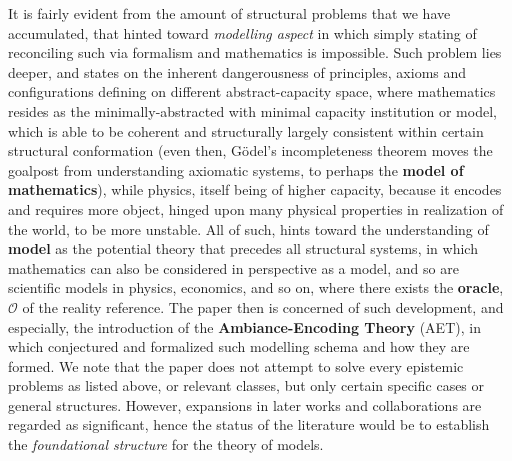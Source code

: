 It is fairly evident from the amount of structural problems that we have accumulated, that hinted toward \textit{modelling aspect} in which simply stating of reconciling such via formalism and mathematics is impossible. Such problem lies deeper, and states on the inherent dangerousness of principles, axioms and configurations defining on different abstract-capacity space, where mathematics resides as the minimally-abstracted with minimal capacity institution or model, which is able to be coherent and structurally largely consistent within certain structural conformation (even then, Gödel's incompleteness theorem moves the goalpost from understanding axiomatic systems, to perhaps the \textbf{model of mathematics}), while physics, itself being of higher capacity, because it encodes and requires more object, hinged upon many physical properties in realization of the world, to be more unstable. All of such, hints toward the understanding of \textbf{model} as the potential theory that precedes all structural systems, in which mathematics can also be considered in perspective as a model, and so are scientific models in physics, economics, and so on, where there exists the \textbf{oracle}, $\mathcal{O}$ of the reality reference. The paper then is concerned of such development, and especially, the introduction of the \textbf{Ambiance-Encoding Theory} (AET), in which conjectured and formalized such modelling schema and how they are formed. We note that the paper does not attempt to solve every epistemic problems as listed above, or relevant classes, but only certain specific cases or general structures. However, expansions in later works and collaborations are regarded as significant, hence the status of the literature would be to establish the \textit{foundational structure} for the theory of models. 


